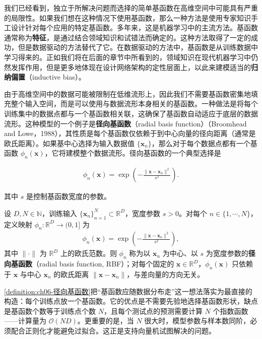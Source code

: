 \documentclass[../../main.tex]{subfiles}
\begin{document}
我们已经看到，独立于所解决问题而选择的简单基函数在高维空间中可能具有严重的局限性。如果我们想在这种情况下使用基函数，那么一种方法是使用专家知识手工设计针对每个应用的特定基函数。多年来，这是机器学习中的主流方法。基函数通常称为\textbf{特征}，是通过结合领域知识和试错法而确定的。这种方法取得了一定的成功，但是数据驱动的方法替代了它。在数据驱动的方法中，基函数是从训练数据中学习得来的。正如我们将在后面的章节中所看到的，领域知识在现代机器学习中仍然发挥作用，但是更多地体现在设计网络架构的定性层面上，以此来建模适当的\textbf{归纳偏置}（inductive bias）。

由于高维空间中的数据可能被限制在低维流形上，因此我们不需要基函数密集地填充整个输入空间，而是可以使用与数据流形本身相关的基函数。一种做法是将每个训练集中的数据点都与一个基函数相关联，这确保了基函数自动适应于底层的数据流形。这种模型的一个例子是\textbf{径向基函数}（radial basis function）（Broomhead and Lowe，1988），其性质是每个基函数仅依赖于到中心向量的径向距离（通常是欧氏距离）。如果基中心选择为输入数据值 $\{\boldsymbol{x}_n\}$，那么对于每个数据点都有一个基函数 $\phi_n(\boldsymbol{x})$，它将建模整个数据流形。径向基函数的一个典型选择是

\begin{align}
\phi_n(\boldsymbol{x})=\exp\!\left(-\frac{\|\boldsymbol{x}-\boldsymbol{x}_n\|^{2}}{s^{2}}\right).
\end{align}

其中 $s$ 是控制基函数宽度的参数。

\begin{definition}[径向基函数]\label{definition:ch06-径向基函数}
设 $D,N\in\mathbb{N}$，训练输入 $\{\boldsymbol{x}_n\}_{n=1}^{N}\subset\mathbb{R}^{D}$，宽度参数 $s>0$。对每个 $n\in\{1,\cdots,N\}$，定义映射 $\phi_{n}:\mathbb{R}^{D}\to(0,1]$ 为
\begin{align}
\phi_n(\boldsymbol{x})=\exp\!\left(-\frac{\|\boldsymbol{x}-\boldsymbol{x}_n\|^{2}}{s^{2}}\right),
\label{align:ch06-径向基函数}
\end{align}
其中 $\|\cdot\|$ 为 $\mathbb{R}^{D}$ 上的欧氏范数。则 $\phi_{n}$ 称为以 $\boldsymbol{x}_{n}$ 为中心、以 $s$ 为宽度参数的\textbf{径向基函数}（radial basis function, RBF）；对每个固定的 $\boldsymbol{x}\in\mathbb{R}^{D}$，$\phi_{n}(\boldsymbol{x})$ 只依赖于 $\boldsymbol{x}$ 与中心 $\boldsymbol{x}_{n}$ 的欧氏距离 $\|\boldsymbol{x}-\boldsymbol{x}_n\|$，与差向量的方向无关。
\end{definition}

\begin{remark}\cref{definition:ch06-径向基函数}把“基函数应随数据分布走”这一想法落实为最直接的构造：每个训练点放一个基函数。它的优点是不需要先验地选择基函数形状，缺点是基函数个数等于训练点个数 $N$，且每个测试点的预测需要计算 $N$ 个指数函数——计算量为 $\mathcal{O}(ND)$。更重要的是，当 $N$ 很大时，模型参数与样本数同阶，必须配合正则化才能避免过拟合。这正是支持向量机试图解决的问题。
\end{remark}
\end{document}
